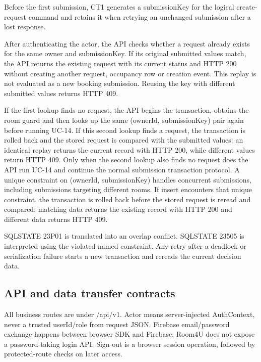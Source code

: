 Before the first submission, CT1 generates a submissionKey for the logical create-request command and retains it when retrying an unchanged submission after a lost response.\par

After authenticating the actor, the API checks whether a request already exists for the same owner and submissionKey. If its original submitted values match, the API returns the existing request with its current status and HTTP 200 without creating another request, occupancy row or creation event. This replay is not evaluated as a new booking submission. Reusing the key with different submitted values returns HTTP 409.\par

If the first lookup finds no request, the API begins the transaction, obtains the room guard and then looks up the same (ownerId, submissionKey) pair again before running UC-14. If this second lookup finds a request, the transaction is rolled back and the stored request is compared with the submitted values: an identical replay returns the current record with HTTP 200, while different values return HTTP 409. Only when the second lookup also finds no request does the API run UC-14 and continue the normal submission transaction protocol. A unique constraint on (ownerId, submissionKey) handles concurrent submissions, including submissions targeting different rooms. If insert encounters that unique constraint, the transaction is rolled back before the stored request is reread and compared; matching data returns the existing record with HTTP 200 and different data returns HTTP 409.\par

SQLSTATE 23P01 is translated into an overlap conflict. SQLSTATE 23505 is interpreted using the violated named constraint. Any retry after a deadlock or serialization failure starts a new transaction and rereads the current decision data.\par

\subsection{API and data transfer contracts}

All business routes are under /api/v1. Actor means server-injected AuthContext, never a trusted userId/role from request JSON. Firebase email/password exchange happens between browser SDK and Firebase; Room4U does not expose a password-taking login API. Sign-out is a browser session operation, followed by protected-route checks on later access.\par

